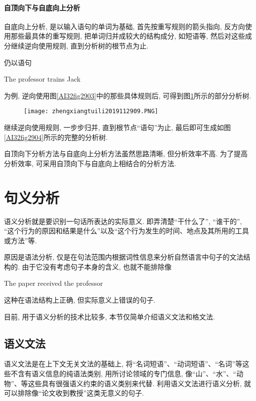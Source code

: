 \paragraph{自顶向下与自底向上分析}
自底向上分析, 是以输入语句的单词为基础, 首先按重写规则的箭头指向, 反方向使用那些最具体的重写规则, 把单词归并成较大的结构成分, 如短语等, 然后对这些成分继续逆向使用规则, 直到分析树的根节点为止.

仍以语句
\begin{center}
  The  professor  trains  Jack
\end{center}
为例, 逆向使用图\ref{AI32fig2903}中的那些具体规则后, 可得到图\ref{AI32fig2909}所示的部分分析树.
\begin{figure}[H]
\centering
\texttt{[image: zhengxiangtuili2019112909.PNG]}
\caption{}
\label{AI32fig2909}
\end{figure}

继续逆向使用规则, 一步步归并, 直到根节点“语句”为止, 最后即可生成如图\ref{AI32fig2904}所示的完整的分析树.

自顶向下分析方法与自底向上分析方法虽然思路清晰, 但分析效率不高. 为了提高分析效率, 可采用自顶向下与自底向上相结合的分析方法.

\section{句义分析}

语义分析就是要识别一句话所表达的实际意义. 即弄清楚“干什么了”, “谁干的”, “这个行为的原因和结果是什么”以及“这个行为发生的时间、地点及其所用的工具或方法”等.

原因是语法分析, 仅是在句法范围内根据词性信息来分析自然语言中句子的文法结构的. 由于它没有考虑句子本身的含义, 也就不能排除像
\begin{center}
  The  paper  received  the  professor
\end{center}
这种在语法结构上正确, 但实际意义上错误的句子.

目前, 用于语义分析的技术比较多, 本节仅简单介绍语义文法和格文法.
\subsection{语义文法}
    语义文法是在上下文无关文法的基础上, 将“名词短语”、“动词短语”、“名词”等这些不含有语义信息的纯语法类别, 用所讨论领域的专门信息, 像“山”、“水”、“动物”、等这些具有很强语义约束的语义类别来代替. 利用语义文法进行语义分析, 就可以排除像“论文收到教授”这类无意义的句子.

